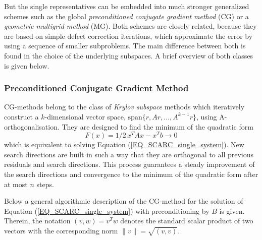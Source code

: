 But the single representatives can be embedded into much stronger generalized schemes such as the global {\it preconditioned conjugate gradient method} (CG) or a {\it geometric multigrid method} (MG).
Both schemes are closely related, because they are based on simple defect
correction iterations, which approximate the error by using a sequence of smaller subproblems. 
The main difference between both is found in the choice of the underlying subspaces.
A brief overview of both classes is given below.


\subsubsection{Preconditioned Conjugate Gradient Method} 
\label{SEC_SCARC_cg}

CG-methods belong to the class of {\it Krylov subspace} methods which iteratively construct a $k$-dimensional vector space, 
$\mbox{span}\{r,Ar,...,A^{k-1}r\}$, using A-orthogonalisation. They are designed to find the minimum of the quadratic form 
\[F(x)=1/2\, x^T A x - x^T b \rightarrow 0\] 
which is equivalent to solving Equation (\ref{EQ_SCARC_single_system}). 
New search directions are built in such a way that they are orthogonal to all previous residuals and search directions. This process guarantees a steady improvement of the search directions and convergence to the minimum of the quadratic form after at most $n$ steps. %

Below a general algorithmic description of the CG-method for the solution of Equation (\ref{EQ_SCARC_single_system}) with preconditioning by $B$ is given.
Therein, the notation $(v,w)=v^T w$ denotes the standard scalar product of two vectors with the corresponding norm $\|v\| =\sqrt{(v,v)}$.


\newpage

